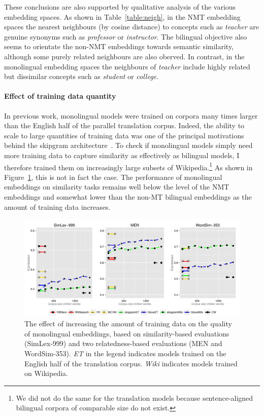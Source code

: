 These conclusions are also supported by qualitative analysis of the various embedding spaces. As shown in Table~\ref{table:neigh}, in the NMT embedding spaces the nearest neighbours (by cosine distance) to concepts such as \emph{teacher} are genuine synonyms such as \emph{professor} or \emph{instructor}. The bilingual objective also seems to orientate the non-NMT embeddings towards semantic similarity, although some purely related neighbours are also oberved. In contrast, in the monolingual embedding spaces the neighbours of \emph{teacher} include  highly related but dissimilar concepts such as \emph{student} or \emph{college}. 

 
\paragraph{Effect of training data quantity}

In previous work, monolingual models were trained on corpora many times larger than the English half of the parallel translation corpus. Indeed, the ability to scale to large quantities of training data was one of the principal motivations behind the skipgram architecture~\citep{mikolov2013distributed}. To check if monolingual models simply need more training data to capture similarity as effectively as bilingual models, I therefore trained them on increasingly large subsets of Wikipedia.\footnote{We did not do the same for the translation models because sentence-aligned bilingual corpora of comparable size do not exist.} As shown in Figure~\ref{fig:size}, this is not in fact the case. The performance of monolingual embeddings on similarity tasks remains well below the level of the NMT embeddings and somewhat lower than the non-MT bilingual embeddings as the amount of training data increases. 

\begin{figure}[h]
\includegraphics[width = \textwidth,clip=True,trim=0 10 0 10]{Chapter_3/Figure_1_ICLR2015}
\vspace{-4mm}
\caption{The effect of increasing the amount of training data on the quality of monolingual embeddings, based on similarity-based evaluations (SimLex-999) and two relatedness-based evaluations (MEN and WordSim-353). \emph{ET} in the legend indicates models trained on the English half of the translation corpus. \emph{Wiki} indicates models trained on Wikipedia.}
\label{fig:size}
\end{figure}


